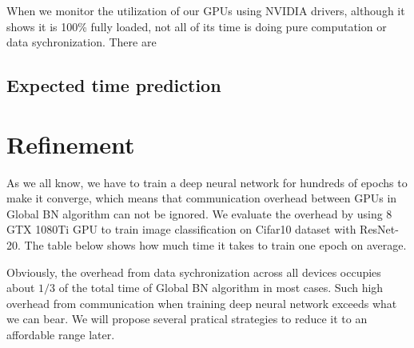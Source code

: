 When we monitor the utilization of our GPUs using NVIDIA drivers, although it shows it is 100\% fully loaded, not all of its time is doing pure computation or data sychronization. There are 

\subsection{Expected time prediction}




\section{Refinement}

As we all know, we have to train a deep neural network for hundreds of epochs to make it converge, which means that communication overhead between GPUs in Global BN algorithm can not be ignored. We evaluate the overhead by using 8 GTX 1080Ti GPU to  train image classification on Cifar10 dataset\cite{krizhevsky2014cifar} with ResNet-20. The table below shows how much time it takes to train one epoch on average.

    
        

Obviously, the overhead from data sychronization across all devices occupies about $1/3$ of the total time of Global BN algorithm in most cases. Such high overhead from communication when training deep neural network exceeds what we can bear. We will propose several pratical strategies to reduce it to an affordable range later.

